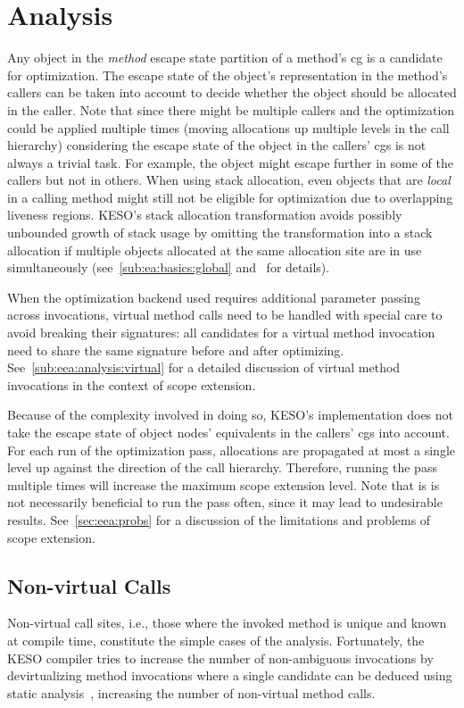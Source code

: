 	\section{Analysis}
		\label{sec:eea:analysis}
		Any object in the \emph{method} escape state partition of a method's \gls{cg} is a candidate for optimization. The
		escape state of the object's representation in the method's callers can be taken into account to decide whether the
		object should be allocated in the caller. Note that since there might be multiple callers and the optimization could
		be applied multiple times (moving allocations up multiple levels in the call hierarchy) considering the escape state
		of the object in the callers' \glspl{cg} is not always a trivial task. For example, the object might escape further
		in some of the callers but not in others. When using stack allocation, even objects that are \emph{local} in
		a calling method might still not be eligible for optimization due to overlapping liveness regions. KESO's stack
		allocation transformation avoids possibly unbounded growth of stack usage by omitting the transformation into
		a stack allocation if multiple objects allocated at the same allocation site are in use simultaneously
		(see~\cref{sub:ea:basics:global} and~\cite[Sec.~3.3]{lang:12} for details).

		When the optimization backend used requires additional parameter passing across invocations, virtual method calls
		need to be handled with special care to avoid breaking their signatures: all candidates for a virtual method
		invocation need to share the same signature before and after optimizing. See~\cref{sub:eea:analysis:virtual} for
		a detailed discussion of virtual method invocations in the context of scope extension.

		Because of the complexity involved in doing so, KESO's implementation does not take the escape state of object
		nodes' equivalents in the callers' \glspl{cg} into account. For each run of the optimization pass, allocations are
		propagated at most a single level up against the direction of the call hierarchy. Therefore, running the pass
		multiple times will increase the maximum scope extension level. Note that is is not necessarily beneficial to run
		the pass often, since it may lead to undesirable results. See~\cref{sec:eea:probs} for a discussion of the
		limitations and problems of scope extension.

		\subsection{Non-virtual Calls}
			\label{sub:eea:analysis:nonvirtual}
			Non-virtual call sites, i.e., those where the invoked method is unique and known at compile time, constitute the
			simple cases of the analysis. Fortunately, the KESO compiler tries to increase the number of non-ambiguous
			invocations by devirtualizing method invocations where a single candidate can be deduced using static
			analysis~\cite[Sec.~3.4]{erhardt:11:jtres}, increasing the number of non-virtual method calls.

